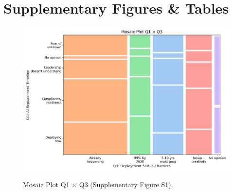 \documentclass{article}
\begin{document}
\section{Supplementary Figures \&
  Tables}\label{supplementary-figures-tables}

\begin{figure}[htbp]

	{\includegraphics[width=\textwidth, keepaspectratio]{figs/Q1xQ3_mosaic_supplementary_s1.png}}

	\caption{Mosaic Plot Q1 × Q3 (Supplementary Figure S1).}\label{fig:q1xq3_mosaic}

\end{figure}%
\end{document}

